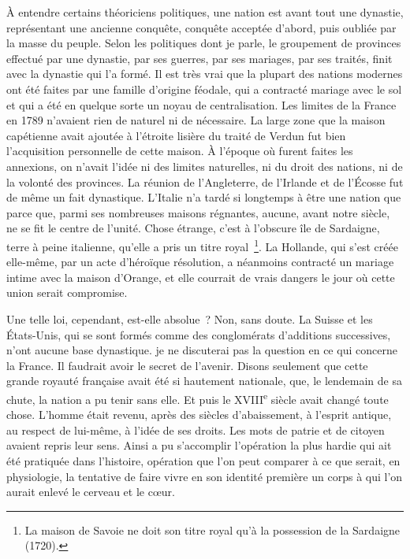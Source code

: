 \documentclass[twoside]{book} %
\newcommand\orgName[1]{#1}
\newcommand\placeName[1]{#1}
\newcommand\chaptercont{} %
\begin{document}
\chaptercont
\noindent À entendre certains théoriciens politiques, une nation est avant tout une dynastie, représentant une ancienne conquête, conquête acceptée d’abord, puis oubliée par la masse du peuple. Selon les politiques dont je parle, le groupement de provinces effectué par une dynastie, par ses guerres, par ses mariages, par ses traités, finit avec la dynastie qui l’a formé. Il est très vrai que la plupart des nations modernes ont été faites par une famille d’origine féodale, qui a contracté mariage avec le sol et qui a été en quelque sorte un noyau de centralisation. Les limites de la {\placeName France} en 1789 n’avaient rien de naturel ni de nécessaire. La large zone que la {\orgName maison capétienne} avait ajoutée à l’étroite lisière du traité de Verdun fut bien l’acquisition personnelle de cette maison. À l’époque où furent faites les annexions, on n’avait l’idée ni des limites naturelles, ni du droit des nations, ni de la volonté des provinces. La réunion de l’{\placeName Angleterre}, de l’{\placeName Irlande} et de l’{\placeName Écosse} fut de même un fait dynastique. L’{\placeName Italie} n’a tardé si longtemps à être une nation que parce que, parmi ses nombreuses maisons régnantes, aucune, avant notre siècle, ne se fit le centre de l’unité. Chose étrange, c’est à l’obscure île de {\placeName Sardaigne}, terre à peine italienne, qu’elle a pris un titre royal \footnote{La {\orgName maison de Savoie} ne doit son titre royal qu’à la possession de la {\placeName Sardaigne} (1720).}. La {\placeName Hollande}, qui s’est créée elle-même, par un acte d’héroïque résolution, a néanmoins contracté un mariage intime avec la {\orgName maison d’Orange}, et elle courrait de vrais dangers le jour où cette union serait compromise.\par
Une telle loi, cependant, est-elle absolue ? Non, sans doute. La {\placeName Suisse} et les {\placeName États-Unis}, qui se sont formés comme des conglomérats d’additions successives, n’ont aucune base dynastique. je ne discuterai pas la question en ce qui concerne la {\placeName France}. Il faudrait avoir le secret de l’avenir. Disons seulement que cette grande royauté française avait été si hautement nationale, que, le lendemain de sa chute, la nation a pu tenir sans elle. Et puis le XVIII\textsuperscript{e} siècle avait changé toute chose. L’homme était revenu, après des siècles d’abaissement, à l’esprit antique, au respect de lui-même, à l’idée de ses droits. Les mots de patrie et de citoyen avaient repris leur sens. Ainsi a pu s’accomplir l’opération la plus hardie qui ait été pratiquée dans l’histoire, opération que l’on peut comparer à ce que serait, en physiologie, la tentative de faire vivre en son identité première un corps à qui l’on aurait enlevé le cerveau et le cœur.\par
\end{document}
